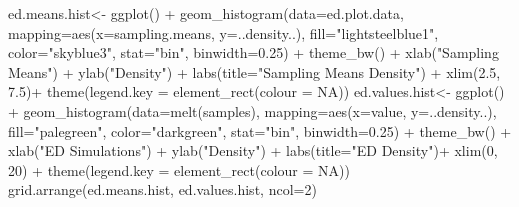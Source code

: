 \documentclass[]{article}
\newenvironment{Shaded}{}{}
\newcommand{\KeywordTok}[1]{\textcolor[rgb]{0.00,0.00,1.00}{{#1}}}
\newcommand{\DataTypeTok}[1]{{#1}}
\newcommand{\DecValTok}[1]{{#1}}
\newcommand{\FloatTok}[1]{{#1}}
\newcommand{\StringTok}[1]{\textcolor[rgb]{0.00,0.50,0.50}{{#1}}}
\newcommand{\OtherTok}[1]{\textcolor[rgb]{1.00,0.25,0.00}{{#1}}}
\newcommand{\NormalTok}[1]{{#1}}
\begin{document}
\begin{Shaded}
\begin{Highlighting}[]
\NormalTok{ed.means.hist<-}\StringTok{ }\KeywordTok{ggplot}\NormalTok{() +}\StringTok{ }
\StringTok{        }\KeywordTok{geom_histogram}\NormalTok{(}\DataTypeTok{data=}\NormalTok{ed.plot.data, }
                       \DataTypeTok{mapping=}\KeywordTok{aes}\NormalTok{(}\DataTypeTok{x=}\NormalTok{sampling.means, }\DataTypeTok{y=}\NormalTok{..density..), }
                       \DataTypeTok{fill=}\StringTok{"lightsteelblue1"}\NormalTok{, }
                       \DataTypeTok{color=}\StringTok{"skyblue3"}\NormalTok{, }\DataTypeTok{stat=}\StringTok{"bin"}\NormalTok{, }\DataTypeTok{binwidth=}\FloatTok{0.25}\NormalTok{) +}
\StringTok{        }\KeywordTok{theme_bw}\NormalTok{() +}\StringTok{ }\KeywordTok{xlab}\NormalTok{(}\StringTok{"Sampling Means"}\NormalTok{) +}\StringTok{ }\KeywordTok{ylab}\NormalTok{(}\StringTok{"Density"}\NormalTok{) +}\StringTok{ }
\StringTok{        }\KeywordTok{labs}\NormalTok{(}\DataTypeTok{title=}\StringTok{"Sampling Means Density"}\NormalTok{) +}\StringTok{  }
\StringTok{        }\KeywordTok{xlim}\NormalTok{(}\FloatTok{2.5}\NormalTok{, }\FloatTok{7.5}\NormalTok{)+}
\StringTok{        }\KeywordTok{theme}\NormalTok{(}\DataTypeTok{legend.key =} \KeywordTok{element_rect}\NormalTok{(}\DataTypeTok{colour =} \OtherTok{NA}\NormalTok{))}
\NormalTok{ed.values.hist<-}\StringTok{ }\KeywordTok{ggplot}\NormalTok{() +}
\StringTok{        }\KeywordTok{geom_histogram}\NormalTok{(}\DataTypeTok{data=}\KeywordTok{melt}\NormalTok{(samples), }
                       \DataTypeTok{mapping=}\KeywordTok{aes}\NormalTok{(}\DataTypeTok{x=}\NormalTok{value, }\DataTypeTok{y=}\NormalTok{..density..), }
                       \DataTypeTok{fill=}\StringTok{"palegreen"}\NormalTok{, }
                       \DataTypeTok{color=}\StringTok{"darkgreen"}\NormalTok{, }
                       \DataTypeTok{stat=}\StringTok{"bin"}\NormalTok{, }
                       \DataTypeTok{binwidth=}\FloatTok{0.25}\NormalTok{) +}
\StringTok{        }\KeywordTok{theme_bw}\NormalTok{() +}\StringTok{ }\KeywordTok{xlab}\NormalTok{(}\StringTok{"ED Simulations"}\NormalTok{) +}\StringTok{ }\KeywordTok{ylab}\NormalTok{(}\StringTok{"Density"}\NormalTok{) +}\StringTok{ }
\StringTok{        }\KeywordTok{labs}\NormalTok{(}\DataTypeTok{title=}\StringTok{"ED Density"}\NormalTok{)+}\StringTok{  }\KeywordTok{xlim}\NormalTok{(}\DecValTok{0}\NormalTok{, }\DecValTok{20}\NormalTok{) +}
\StringTok{        }\KeywordTok{theme}\NormalTok{(}\DataTypeTok{legend.key =} \KeywordTok{element_rect}\NormalTok{(}\DataTypeTok{colour =} \OtherTok{NA}\NormalTok{))}
\KeywordTok{grid.arrange}\NormalTok{(ed.means.hist, ed.values.hist, }\DataTypeTok{ncol=}\DecValTok{2}\NormalTok{)}
\end{Highlighting}
\end{Shaded}
\end{document}
